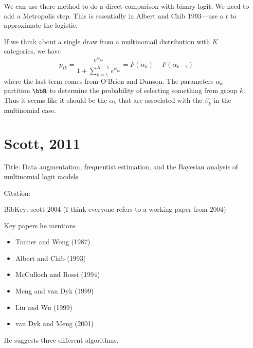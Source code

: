 \documentclass{article}
\begin{document}
We can use there method to do a direct comparison with binary logit.  We need to
add a Metropolis step.  This is essentially in Albert and Chib 1993---use a $t$
to approximate the logistic.

If we think about a single draw from a multinomail distribution with $K$
categories, we have
\[
p_{ik} = \frac{e^{\psi_{ik}}}{1 + \sum_{k=1}^{K-1} e^{\psi_{ik}}} = F(\alpha_k)
- F(\alpha_{k-1})
\]
where the last term comes from O'Brien and Dunson.  The parameters $\alpha_k$
partition $\bbR$ to determine the probability of selecting something from group
$k$.  Thus it seems like it should be the $\alpha_k$ that are associated with
the $\beta_k$ in the multinomial case.

\section{Scott, 2011}

Title: Data augmentation, frequentist estimation, and the Bayesian analysis of
multinomial logit models

Citation: \cite{scott-2004}

BibKey: scott-2004 (I think everyone refers to a working paper from 2004)

Key papers he mentions
\begin{itemize}
\item Tanner and Wong (1987)
\item Albert and Chib (1993)
\item McCulloch and Rossi (1994)
\item Meng and van Dyk (1999)
\item Liu and Wu (1999)
\item van Dyk and Meng (2001)
\end{itemize}

He suggests three different algorithms.
\end{document}
